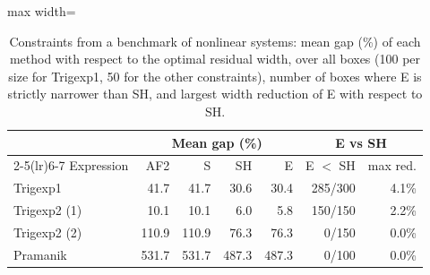 \begin{table}[H]
\centering
\caption{Constraints from a benchmark of nonlinear systems: mean gap (\%) of each method with respect to the optimal residual width, over all boxes (100 per size for Trigexp1, 50 for the other constraints), number of boxes where E is strictly narrower than SH, and largest width reduction of E with respect to SH.}
\label{tab:constraints}
\small
\setlength{\tabcolsep}{4pt}
\begin{adjustbox}{max width=\linewidth}\begin{tabular}{lrrrrrr}
\toprule
 & \multicolumn{4}{c}{Mean gap (\%)} & \multicolumn{2}{c}{E vs SH} \\
\cmidrule(lr){2-5}\cmidrule(lr){6-7}
Expression & AF2 & S & SH & E & E $<$ SH & max red. \\
\midrule
Trigexp1 & 41.7 & 41.7 & 30.6 & 30.4 & 285/300 & 4.1\% \\
Trigexp2 (1) & 10.1 & 10.1 & 6.0 & 5.8 & 150/150 & 2.2\% \\
Trigexp2 (2) & 110.9 & 110.9 & 76.3 & 76.3 & 0/150 & 0.0\% \\
Pramanik & 531.7 & 531.7 & 487.3 & 487.3 & 0/100 & 0.0\% \\
\bottomrule
\end{tabular}\end{adjustbox}
\end{table}